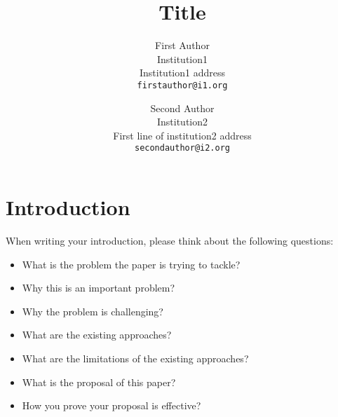 \documentclass[10pt,twocolumn,letterpaper]{article}
\begin{document}
\title{Title}

\author{First Author\\
Institution1\\
Institution1 address\\
{\tt\small firstauthor@i1.org}
\and
Second Author\\
Institution2\\
First line of institution2 address\\
{\tt\small secondauthor@i2.org}
}
\maketitle

\begin{abstract}
\end{abstract}




\section{Introduction}
When writing your introduction, please think about the following questions:

\begin{itemize}
    \item What is the problem the paper is trying to tackle?
\item Why this is an important problem?
\item Why the problem is challenging?
\item What are the existing approaches?
\item What are the limitations of the existing approaches?
\item What is the proposal of this paper?
\item How you prove your proposal is effective?
\end{itemize}
\end{document}
